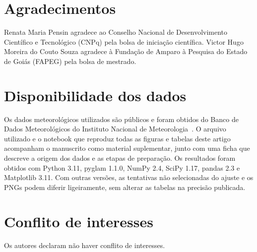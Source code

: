 \section*{Agradecimentos}
Renata Maria Pensin agradece ao Conselho Nacional de Desenvolvimento Científico e Tecnológico (CNPq) pela bolsa de iniciação científica. Victor Hugo Moreira do Couto Souza agradece à Fundação de Amparo à Pesquisa do Estado de Goiás (FAPEG) pela bolsa de mestrado.

\section*{Disponibilidade dos dados}
Os dados meteorológicos utilizados são públicos e foram obtidos do Banco de Dados Meteorológicos do Instituto Nacional de Meteorologia~\cite{inmet2025}. O arquivo utilizado e o notebook que reproduz todas as figuras e tabelas deste artigo acompanham o manuscrito como material suplementar, junto com uma ficha que descreve a origem dos dados e as etapas de preparação. Os resultados foram obtidos com Python 3.11, pyglam 1.1.0, NumPy 2.4, SciPy 1.17, pandas 2.3 e Matplotlib 3.11. Com outras versões, as tentativas não selecionadas do ajuste e os PNGs podem diferir ligeiramente, sem alterar as tabelas na precisão publicada.

\section*{Conflito de interesses}
Os autores declaram não haver conflito de interesses.
